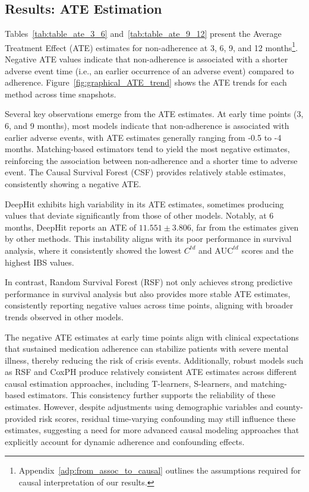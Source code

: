 \subsection{Results: ATE Estimation}
\label{sec:04_results_causal}

Tables~\ref{tab:table_ate_3_6} and~\ref{tab:table_ate_9_12} present the Average Treatment Effect (ATE) estimates for non-adherence at 3, 6, 9, and 12 months\footnote{Appendix~\ref{adp:from_assoc_to_causal} outlines the assumptions required for causal interpretation of our results.}.
Negative ATE values indicate that non-adherence is associated with a shorter adverse event time (i.e., an earlier occurrence of an adverse event) compared to adherence.
Figure~\ref{fig:graphical_ATE_trend} shows the ATE trends for each method across time snapshots.

Several key observations emerge from the ATE estimates. 
At early time points (3, 6, and 9 months), most models indicate that non-adherence is associated with earlier adverse events, with ATE estimates generally ranging from -0.5 to -4 months. 
Matching-based estimators tend to yield the most negative estimates, reinforcing the association between non-adherence and a shorter time to adverse event. 
The Causal Survival Forest (CSF) provides relatively stable estimates, consistently showing a negative ATE.

DeepHit exhibits high variability in its ATE estimates, sometimes producing values that deviate significantly from those of other models. 
Notably, at 6 months, DeepHit reports an ATE of \(11.551 \pm 3.806\), far from the estimates given by other methods. 
This instability aligns with its poor performance in survival analysis, where it consistently showed the lowest \(C^{td}\) and \(\text{AUC}^{td}\) scores and the highest IBS values.

In contrast, Random Survival Forest (RSF) not only achieves strong predictive performance in survival analysis but also provides more stable ATE estimates, consistently reporting negative values across time points, aligning with broader trends observed in other models. 

The negative ATE estimates at early time points align with clinical expectations that sustained medication adherence can stabilize patients with severe mental illness, thereby reducing the risk of crisis events.
Additionally, robust models such as RSF and CoxPH produce relatively consistent ATE estimates across different causal estimation approaches, including T-learners, S-learners, and matching-based estimators.
This consistency further supports the reliability of these estimates.
However, despite adjustments using demographic variables and county-provided risk scores, residual time-varying confounding may still influence these estimates, suggesting a need for more advanced causal modeling approaches that explicitly account for dynamic adherence and confounding effects.

